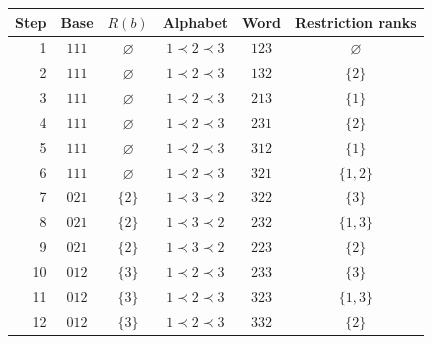 \begin{tabular}{@{}rccccc@{}}
\toprule
Step & Base & $R(b)$ & Alphabet & Word & Restriction ranks \\
\midrule
1 & $111$ & $\varnothing$ & $1\prec 2\prec 3$ & $123$ & $\varnothing$ \\
2 & $111$ & $\varnothing$ & $1\prec 2\prec 3$ & $132$ & $\{2\}$ \\
3 & $111$ & $\varnothing$ & $1\prec 2\prec 3$ & $213$ & $\{1\}$ \\
4 & $111$ & $\varnothing$ & $1\prec 2\prec 3$ & $231$ & $\{2\}$ \\
5 & $111$ & $\varnothing$ & $1\prec 2\prec 3$ & $312$ & $\{1\}$ \\
6 & $111$ & $\varnothing$ & $1\prec 2\prec 3$ & $321$ & $\{1,2\}$ \\
7 & $021$ & $\{2\}$ & $1\prec 3\prec 2$ & $322$ & $\{3\}$ \\
8 & $021$ & $\{2\}$ & $1\prec 3\prec 2$ & $232$ & $\{1,3\}$ \\
9 & $021$ & $\{2\}$ & $1\prec 3\prec 2$ & $223$ & $\{2\}$ \\
10 & $012$ & $\{3\}$ & $1\prec 2\prec 3$ & $233$ & $\{3\}$ \\
11 & $012$ & $\{3\}$ & $1\prec 2\prec 3$ & $323$ & $\{1,3\}$ \\
12 & $012$ & $\{3\}$ & $1\prec 2\prec 3$ & $332$ & $\{2\}$ \\
\bottomrule
\end{tabular}
